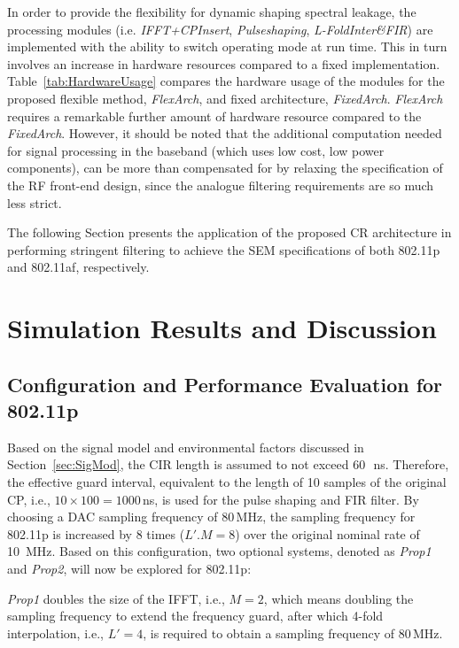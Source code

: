 In order to provide the flexibility for dynamic shaping spectral leakage, the processing modules (i.e. \emph{IFFT+CPInsert}, \emph{Pulseshaping}, \emph{L-FoldInter\&FIR}) are implemented with the ability to switch operating mode at run time. This in turn involves an increase in hardware resources compared to a fixed implementation. Table~\ref{tab:HardwareUsage} compares the hardware usage of the modules for the proposed flexible method, \emph{FlexArch}, and fixed architecture, \emph{FixedArch}. 
\emph{FlexArch} requires a remarkable further amount of hardware resource compared to the \emph{FixedArch}.
However, it should be noted that the additional computation needed for signal processing in the baseband (which uses low cost, low power components), can be more than compensated for by relaxing the specification of the RF front-end design, since the analogue filtering requirements are so much less strict.

The following Section presents the application of the proposed CR architecture in performing stringent filtering to achieve the SEM specifications of both 802.11p and 802.11af, respectively.

\section{Simulation Results and Discussion}
\subsection{Configuration and Performance Evaluation for 802.11p}
Based on the signal model and environmental factors discussed in Section~\ref{sec:SigMod}, the CIR length is assumed to not exceed 60\,~ns.
Therefore, the effective guard interval, equivalent to the length of 10 samples of the original CP, i.e., $10 \times 100=1000$\,ns, is used for the pulse shaping and FIR filter.
By choosing a DAC sampling frequency of 80\,MHz, the sampling frequency for 802.11p is increased by 8 times ($L'.M = 8$) over the original nominal rate of 10~MHz.
Based on this configuration, two optional systems, denoted as \emph{Prop1} and \emph{Prop2}, will now be explored for 802.11p:

\emph{Prop1} doubles the size of the IFFT, i.e., $M=2$, which means doubling the sampling frequency to extend the frequency guard, after which 4-fold interpolation, i.e., $L'=4$, is required to obtain a sampling frequency of 80\,MHz.

